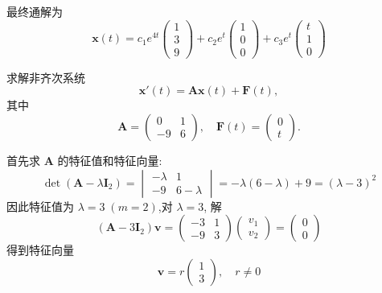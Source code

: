 \begin{questions}
\begin{solution}
\[        \]
        最终通解为
        \[
        \boldsymbol{x}(t) = c_1 e^{4t} \begin{pmatrix} 1 \\ 3 \\ 9 \end{pmatrix} + c_2 e^t \begin{pmatrix} 1 \\ 0 \\ 0 \end{pmatrix} + c_3 e^t \begin{pmatrix} t \\ 1 \\ 0 \end{pmatrix}
        \]
    \end{solution}

    \question 求解非齐次系统
    \[
    \boldsymbol{x}'(t) = \boldsymbol{A} \boldsymbol{x}(t) + \boldsymbol{F}(t),
    \]
    其中
    \[
    \boldsymbol{A} = \begin{pmatrix} 0 & 1 \\ -9 & 6 \end{pmatrix}, \quad \boldsymbol{F}(t) = \begin{pmatrix} 0 \\ t \end{pmatrix}.
    \]
    \begin{solution}
        首先求 $\boldsymbol{A}$ 的特征值和特征向量:
        \[
        \det(\boldsymbol{A} - \lambda \boldsymbol{I}_2) = \begin{vmatrix} -\lambda & 1 \\ -9 & 6-\lambda \end{vmatrix} = -\lambda(6-\lambda)+9 = (\lambda-3)^2
        \]
        因此特征值为 $\lambda = 3\;(m=2)$,对 $\lambda = 3$, 解
        \[
        (\boldsymbol{A}-3\boldsymbol{I}_2) \boldsymbol{v} = \begin{pmatrix}-3 & 1 \\ -9 & 3\end{pmatrix} \begin{pmatrix} v_1 \\ v_2 \end{pmatrix} = \begin{pmatrix}0 \\ 0\end{pmatrix}
        \]
        得到特征向量
        \[
        \boldsymbol{v} = r \begin{pmatrix} 1 \\ 3 \end{pmatrix}, \quad r \neq 0
\]
\end{solution}
\end{questions}
